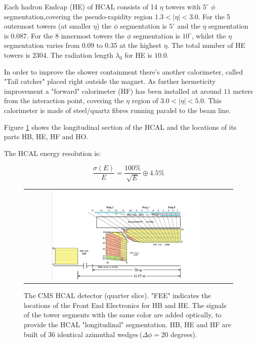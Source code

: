 Each hadron Endcap (HE) of HCAL consists of 14 $\eta$ towers with $5^{\circ}$ $\phi$ segmentation,covering the pseudo-rapidity region $1.3 < |\eta| < 3.0$. For the 5 outermost towers (at smaller $\eta$) the $\phi$ segmentation is $5^{\circ}$ and the $\eta$ segmentation is 0.087. For the 8 innermost towers the $\phi$ segmentation is $10^{\circ}$, whilst the $\eta$ segmentation varies from 0.09 to 0.35 at the highest $\eta$. The total number of HE towers is 2304. The radiation length $\lambda_{0}$ for HE is $10.0$.

In order to improve the shower containment there's another calorimeter, called "Tail catcher" placed right outside the magnet. As further hermeticity improvement a "forward" calorimeter (HF) has been installed at around $11$ meters from the interaction point, covering the $\eta$ region of $3.0 < |\eta| <5.0$. This calorimeter is made of steel/quartz fibres running paralel to the beam line.

Figure \ref{fig:HCAL_section} shows the longitudinal section of the HCAL and the locations of its parts HB, HE, HF and HO.

The HCAL energy resolution is:

\begin{equation}
\dfrac{\sigma(E)}{E} = \dfrac{100\%}{\sqrt{E}}\oplus 4.5\%
\end{equation}

\begin{figure}[tbh!]
	\centering
	\begin{tabular}{cc}
		\includegraphics[width=0.75\textwidth]{detector/pics/HCAL_section.png}
	\end{tabular}
	\caption{The CMS HCAL detector (quarter slice). "FEE" indicates the locations of the Front End Electronics for HB and HE. The signals of the tower segments with the same color are added optically, to provide the HCAL "longitudinal" segmentation. HB, HE and HF are built of 36 identical azimuthal wedges\,($\Delta\phi = 20$ degrees).}
	\label{fig:HCAL_section}
\end{figure}

